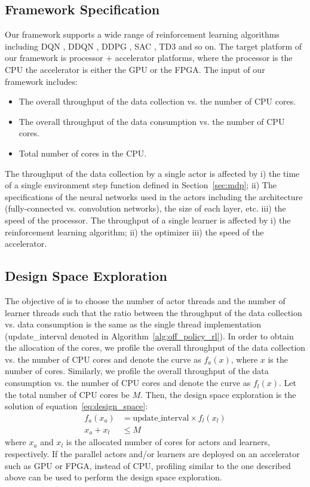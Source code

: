 \subsection{Framework Specification}
Our framework supports a wide range of reinforcement learning algorithms including DQN \cite{dqn}, DDQN \cite{double_q_learning}, DDPG \cite{ddpg}, SAC \cite{sac}, TD3 \cite{td3} and so on. The target platform of our framework is processor + accelerator platforms, where the processor is the CPU the accelerator is either the GPU or the FPGA. The input of our framework includes:
\begin{itemize}
    \item The overall throughput of the data collection vs. the number of CPU cores.
    \item The overall throughput of the data consumption vs. the number of CPU cores.
    \item Total number of cores in the CPU.
\end{itemize}
The throughput of the data collection by a single actor is affected by i) the time of a single environment step function defined in Section~\ref{sec:mdp}; ii) The specifications of the neural networks used in the actors including the architecture (fully-connected vs. convolution networks), the size of each layer, etc. iii) the speed of the processor. The throughput of a single learner is affected by i) the reinforcement learning algorithm; ii) the optimizer iii) the speed of the accelerator.

\subsection{Design Space Exploration}\label{sec:design_space_exp}
The objective of is to choose the number of actor threads and the number of learner threads such that the ratio between the throughput of the data collection vs. data consumption is the same as the single thread implementation (update\_interval denoted in Algorithm~\ref{alg:off_policy_rl}). In order to obtain the allocation of the cores, we profile the overall throughput of the data collection vs. the number of CPU cores and denote the curve as $f_{a}(x)$, where $x$ is the number of cores. Similarly, we profile the overall throughput of the data consumption vs. the number of CPU cores and denote the curve as $f_{l}(x)$. Let the total number of CPU cores be $M$. Then, the design space exploration is the solution of equation~\ref{eq:design_space}:
\begin{align}
    \label{eq:design_space}
    f_{a}(x_a) &= \text{update\_interval}\times f_{l}(x_l) \nonumber\\
    x_a + x_l &\leq M
\end{align}
where $x_a$ and $x_l$ is the allocated number of cores for actors and learners, respectively.
If the parallel actors and/or learners are deployed on an accelerator such as GPU or FPGA, instead of CPU, profiling similar to the one described above can be used to perform the design space exploration. 
